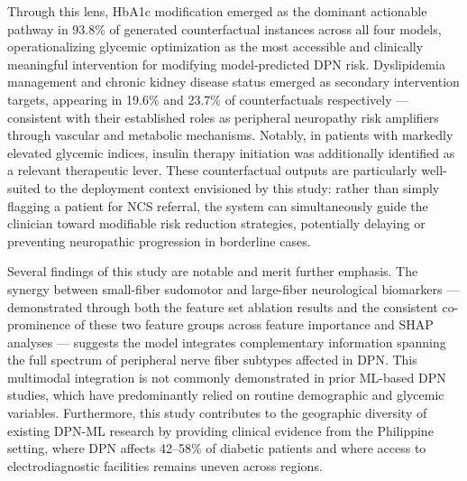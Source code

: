 \documentclass[pdflatex,sn-vancouver-num]{sn-jnl}
\begin{document}
Through this lens, HbA1c modification emerged as the dominant actionable pathway in 93.8\% of generated counterfactual instances across all four models, operationalizing glycemic optimization as the most accessible and clinically meaningful intervention for modifying model-predicted DPN risk. Dyslipidemia management and chronic kidney disease status emerged as secondary intervention targets, appearing in 19.6\% and 23.7\% of counterfactuals respectively — consistent with their established roles as peripheral neuropathy risk amplifiers through vascular and metabolic mechanisms. Notably, in patients with markedly elevated glycemic indices, insulin therapy initiation was additionally identified as a relevant therapeutic lever. These counterfactual outputs are particularly well-suited to the deployment context envisioned by this study: rather than simply flagging a patient for NCS referral, the system can simultaneously guide the clinician toward modifiable risk reduction strategies, potentially delaying or preventing neuropathic progression in borderline cases.

Several findings of this study are notable and merit further emphasis. The synergy between small-fiber sudomotor and large-fiber neurological biomarkers — demonstrated through both the feature set ablation results and the consistent co-prominence of these two feature groups across feature importance and SHAP analyses — suggests the model integrates complementary information spanning the full spectrum of peripheral nerve fiber subtypes affected in DPN. This multimodal integration is not commonly demonstrated in prior ML-based DPN studies, which have predominantly relied on routine demographic and glycemic variables. Furthermore, this study contributes to the geographic diversity of existing DPN-ML research by providing clinical evidence from the Philippine setting, where DPN affects 42–58\% of diabetic patients and where access to electrodiagnostic facilities remains uneven across regions.
\end{document}
